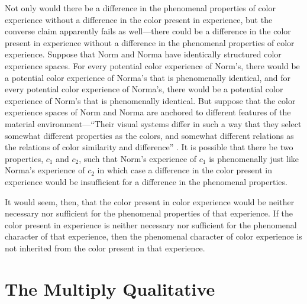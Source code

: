 \documentclass[12pt]{article}
\begin{document}
Not only would there be a difference in the phenomenal properties of color experience without a difference in the color present in experience, but the converse claim apparently fails as well---there could be a difference in the color present in experience without a difference in the phenomenal properties of color experience. Suppose that Norm and Norma have identically structured color experience spaces. For every potential color experience of Norm's, there would be a potential color experience of Norma's that is phenomenally identical, and for every potential color experience of Norma's, there would be a potential color experience of Norm's that is phenomenally identical. But suppose that the color experience spaces of Norm and Norma are anchored to different features of the material environment---``Their visual systems differ in such a way that they select somewhat different properties as the colors, and somewhat different relations as the relations of color similarity and difference'' \citep[p.\ 263]{Shoemaker:wk}. It is possible that there be two properties, \( c_1 \) and \( c_2 \), such that Norm's experience of \( c_1 \) is phenomenally just like Norma's experience of \( c_2 \) in which case a difference in the color present in experience would be insufficient for a difference in the phenomenal properties.

It would seem, then, that the color present in color experience would be neither necessary nor sufficient for the phenomenal properties of that experience. If the color present in experience is neither necessary nor sufficient for the phenomenal character of that experience, then the phenomenal character of color experience is not inherited from the color present in that experience.



\section{The Multiply Qualitative}\label{sec:the_multiply_qualitative} %
\end{document}
